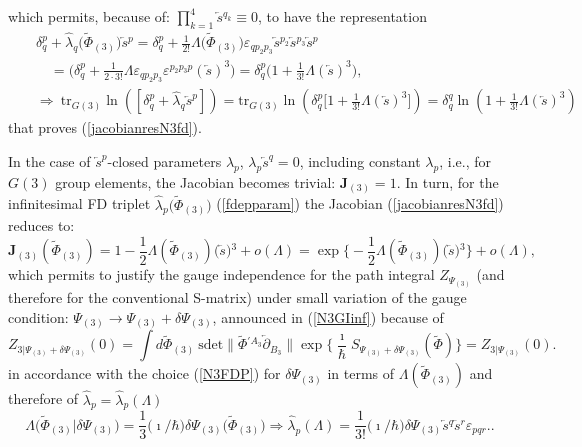 \documentclass[10pt]{article}
\begin{document}
 which permits, because of: $\prod_{k=1}^4\overleftarrow{s}{}^{q_k} \equiv 0$, to have the  representation
\begin{eqnarray}\label{repreN3}
  &&  \delta^p_q+\hat{\lambda}_{q}\big(\widetilde{\Phi}_{(3)}\big) \overleftarrow{s}{}^p = \delta^p_q+  \frac{1}{2!}\Lambda \big(\widetilde{\Phi}_{(3)}\big)\varepsilon
_{qp_2p_3}\overleftarrow{s}{}^{p_2}
\overleftarrow{s}{}^{p_3}\overleftarrow{s}{}^p  \\
&& \quad =  \Big(\delta^p_q+ \frac{1}{2 \cdot 3! }\Lambda \varepsilon
_{qp_2p_3}\varepsilon
^{p_2p_3p}\left(\overleftarrow{s}\right)^3\Big) = \delta^p_q\Big(1+ \frac{1}{3!}\Lambda \left(\overleftarrow{s}\right)^3\Big), \nonumber \\
&&  \Longrightarrow  \  \mathrm{tr}_{G(3)}\ln \left( [\delta^p_q+ \hat{\lambda}_q \overleftarrow{s}^p]\right) = \mathrm{tr}_{G(3)}\ln \left( \delta^p_q\Big[1+ \frac{1}{3!}\Lambda \left(\overleftarrow{s}\right)^3\Big]\right) = \delta^q_q\ln \left( 1+ \frac{1}{3!}\Lambda \left(\overleftarrow{s}\right)^3\right) \label{repreN3f}
\end{eqnarray}
that proves (\ref{jacobianresN3fd}).

In the case of $\overleftarrow{s}^p$-closed parameters ${\lambda}_p$,
${\lambda}_p\overleftarrow{s}^q = 0$, including constant ${\lambda}_p$,
i.e., for $G(3)$ group elements, the Jacobian becomes trivial: $\mathbf{J}_{(3)}=1$.
In turn, for the infinitesimal FD triplet $\hat{\lambda}_p\big(\widetilde{\Phi}_{(3)}\big)$ (\ref{fdepparam})
the Jacobian (\ref{jacobianresN3fd}) reduces to:
\begin{equation}
\mathbf{J}_{(3)}(\widetilde{\Phi}_{(3)}) = 1 - \frac{1}{2}\Lambda (\widetilde{\Phi}_{(3)})\big(\overleftarrow{s}\big){}^{3} +o(\Lambda) = \exp\Big\{- \frac{1}{2}\Lambda (\widetilde{\Phi}_{(3)})\big(\overleftarrow{s}\big){}^{3}\Big\}+o(\Lambda),
\label{jN3fdinf}
\end{equation}%
which permits to justify  the gauge independence for the path integral $Z_{\Psi_{(3)}}$ (and therefore for the conventional S-matrix) under small variation of the gauge condition: $\Psi_{(3)} \to \Psi_{(3)}+\delta \Psi_{(3)}$,  announced in  (\ref{N3GIinf}) because of
\begin{equation}\label{N3GI}
  Z_{3|\Psi_{(3)}+\delta \Psi_{(3)}}(0) =  \int  d \widetilde{\Phi}_{(3)} \  \mathrm{sdet}\|\widetilde{\Phi}{}^{\prime A_3} \overleftarrow{\partial}_{B_3} \| \exp \Big\{\frac{\imath}{\hbar}S_{\Psi_{(3)}+\delta \Psi_{(3)}}(\widetilde{\Phi})\Big\}=   Z_{3|\Psi_{(3)}}(0).
\end{equation}
in accordance with the choice (\ref{N3FDP})   for $\delta \Psi_{(3)}$ in terms of $\Lambda (\widetilde{\Phi}_{(3)})$ and therefore of  $\hat{\lambda}_p = \hat{\lambda}_p(\Lambda)$
\begin{equation}\label{N3FDPder}
 \Lambda \big(\widetilde{\Phi}_{(3)}|\delta \Psi_{(3)}\big) =  \frac{1}{3}\big(\imath / \hbar\big) \delta \Psi_{(3)}\big(\widetilde{\Phi}_{(3)}\big)   \Longrightarrow \hat{\lambda}_p(\Lambda) =  \frac{1}{3!}\big(\imath / \hbar\big) \delta \Psi_{(3)}  \overleftarrow{s}{}^q\overleftarrow{s}{}^r \varepsilon_{pqr}.
.\end{equation}
\end{document}
